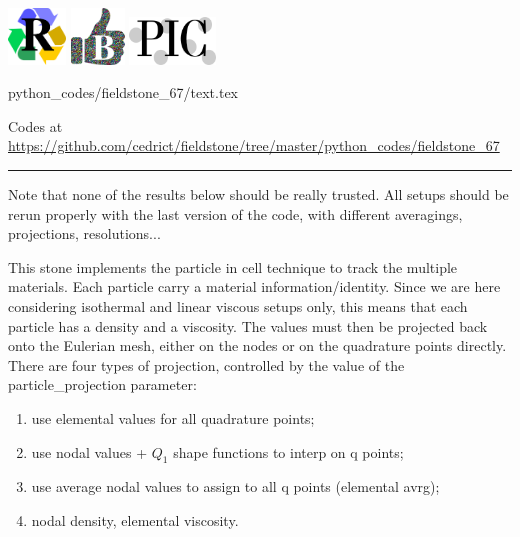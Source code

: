 \includegraphics[height=1.5cm]{images/pictograms/replication}
\includegraphics[height=1.5cm]{images/pictograms/benchmark}
\includegraphics[height=1.25cm]{images/pictograms/pic}

\begin{flushright} {\tiny {\color{gray} python\_codes/fieldstone\_67/text.tex}} \end{flushright}



\begin{center}

Codes at \url{https://github.com/cedrict/fieldstone/tree/master/python_codes/fieldstone_67}
\end{center}

\par\noindent\rule{\textwidth}{0.4pt}



Note that none of the results below should be really trusted. All setups should be rerun 
properly with the last version of the code, with different averagings, projections, resolutions...

This stone implements the particle in cell technique to track the multiple materials.
Each particle carry a material information/identity. Since we are here considering 
isothermal and linear viscous setups only, this means that each particle has a density
and a viscosity. The values must then be projected back onto the Eulerian mesh, either 
on the nodes or on the quadrature points directly.
There are four types of projection, controlled by the value of the 
{\python particle\_projection} parameter:
\begin{enumerate}
\item  use elemental values for all quadrature points;
\item  use nodal values + $Q_1$ shape functions to interp on q points;
\item  use average nodal values to assign to all q points (elemental avrg);
\item  nodal density, elemental viscosity.
\end{enumerate}

